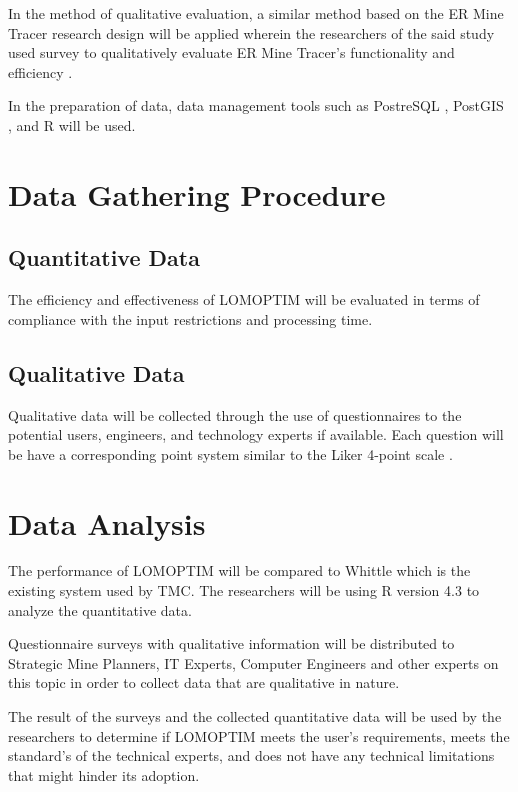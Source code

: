 \documentclass[12pt]{report}
\begin{document}
In the method of qualitative evaluation, a similar method based on the ER Mine Tracer research design will be applied wherein the researchers of the said study used survey to qualitatively evaluate ER Mine Tracer's functionality and efficiency \cite{ERMineTracer}.

In the preparation of data, data management tools such as PostreSQL \cite{postgres}, PostGIS \cite{postgis}, and R \cite{R} will be used.

\section{Data Gathering Procedure}

\subsection{Quantitative Data}

The efficiency and effectiveness of LOMOPTIM will be evaluated in terms of compliance with the input restrictions and processing time.

\subsection{Qualitative Data}

Qualitative data will be collected through the use of questionnaires to the potential users, engineers, and technology experts if available.
Each question will be have a corresponding point system similar to the Liker 4-point scale \cite{Likert}.

\section{Data Analysis}

The performance of LOMOPTIM will be compared to Whittle which is the existing system used by TMC.
The researchers will be using R version 4.3 \cite{R} to analyze the quantitative data.

Questionnaire surveys with qualitative information will be distributed to Strategic Mine Planners, IT Experts, Computer Engineers and other experts on this topic in order to collect data that are qualitative in nature.

The result of the surveys and the collected quantitative data will be used by the researchers to determine if LOMOPTIM meets the user's requirements, meets the standard's of the technical experts, and does not have any technical limitations that might hinder its adoption.
\end{document}
